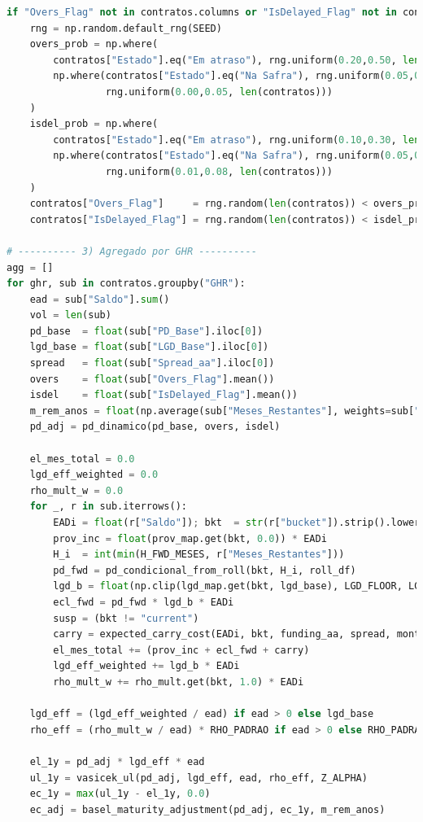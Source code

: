 \documentclass[11pt,a4paper]{article}
\newcommand{\1}{\mathbf{1}}
\begin{document}
\begin{lstlisting}[language=Python, caption={risk_frontier.py (versão completa com normalização por prazo e visões)}]
if "Overs_Flag" not in contratos.columns or "IsDelayed_Flag" not in contratos.columns:
    rng = np.random.default_rng(SEED)
    overs_prob = np.where(
        contratos["Estado"].eq("Em atraso"), rng.uniform(0.20,0.50, len(contratos)),
        np.where(contratos["Estado"].eq("Na Safra"), rng.uniform(0.05,0.15, len(contratos)),
                 rng.uniform(0.00,0.05, len(contratos)))
    )
    isdel_prob = np.where(
        contratos["Estado"].eq("Em atraso"), rng.uniform(0.10,0.30, len(contratos)),
        np.where(contratos["Estado"].eq("Na Safra"), rng.uniform(0.05,0.20, len(contratos)),
                 rng.uniform(0.01,0.08, len(contratos)))
    )
    contratos["Overs_Flag"]     = rng.random(len(contratos)) < overs_prob
    contratos["IsDelayed_Flag"] = rng.random(len(contratos)) < isdel_prob

# ---------- 3) Agregado por GHR ----------
agg = []
for ghr, sub in contratos.groupby("GHR"):
    ead = sub["Saldo"].sum()
    vol = len(sub)
    pd_base  = float(sub["PD_Base"].iloc[0])
    lgd_base = float(sub["LGD_Base"].iloc[0])
    spread   = float(sub["Spread_aa"].iloc[0])
    overs    = float(sub["Overs_Flag"].mean())
    isdel    = float(sub["IsDelayed_Flag"].mean())
    m_rem_anos = float(np.average(sub["Meses_Restantes"], weights=sub["Saldo"]) / 12.0) if ead > 0 else 0.0
    pd_adj = pd_dinamico(pd_base, overs, isdel)

    el_mes_total = 0.0
    lgd_eff_weighted = 0.0
    rho_mult_w = 0.0
    for _, r in sub.iterrows():
        EADi = float(r["Saldo"]); bkt  = str(r["bucket"]).strip().lower()
        prov_inc = float(prov_map.get(bkt, 0.0)) * EADi
        H_i  = int(min(H_FWD_MESES, r["Meses_Restantes"]))
        pd_fwd = pd_condicional_from_roll(bkt, H_i, roll_df)
        lgd_b = float(np.clip(lgd_map.get(bkt, lgd_base), LGD_FLOOR, LGD_CAP))
        ecl_fwd = pd_fwd * lgd_b * EADi
        susp = (bkt != "current")
        carry = expected_carry_cost(EADi, bkt, funding_aa, spread, months=H_i, opex_map=opex_map, suspende_accrual=susp)
        el_mes_total += (prov_inc + ecl_fwd + carry)
        lgd_eff_weighted += lgd_b * EADi
        rho_mult_w += rho_mult.get(bkt, 1.0) * EADi

    lgd_eff = (lgd_eff_weighted / ead) if ead > 0 else lgd_base
    rho_eff = (rho_mult_w / ead) * RHO_PADRAO if ead > 0 else RHO_PADRAO

    el_1y = pd_adj * lgd_eff * ead
    ul_1y = vasicek_ul(pd_adj, lgd_eff, ead, rho_eff, Z_ALPHA)
    ec_1y = max(ul_1y - el_1y, 0.0)
    ec_adj = basel_maturity_adjustment(pd_adj, ec_1y, m_rem_anos)


\end{lstlisting}
\end{document}
